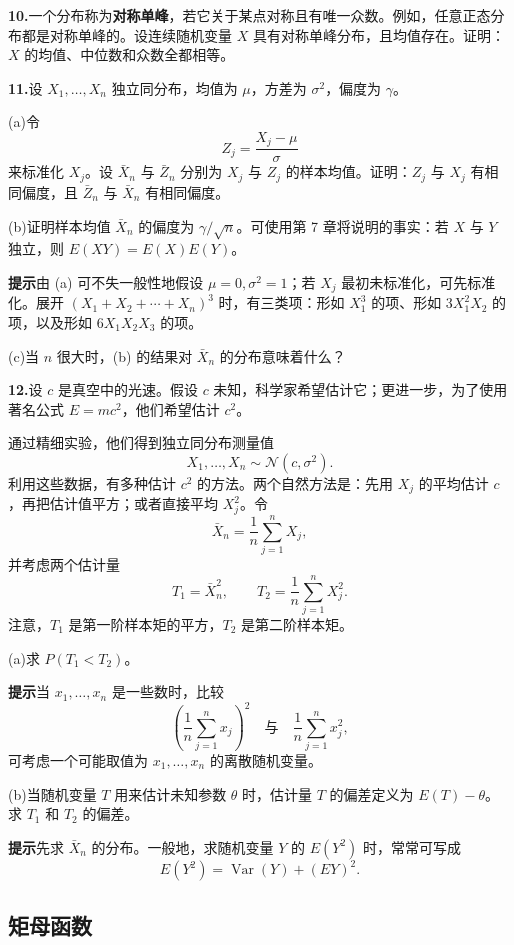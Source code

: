 \documentclass[UTF8, 12pt, fontset=fandol, oneside]{ctexart}
\begin{document}
\noindent\textbf{10.}\quad 一个分布称为\textbf{对称单峰}，若它关于某点对称且有唯一众数。例如，任意正态分布都是对称单峰的。设连续随机变量 $X$ 具有对称单峰分布，且均值存在。证明：$X$ 的均值、中位数和众数全都相等。

\noindent\textbf{11.}\quad 设 $X_1,\ldots,X_n$ 独立同分布，均值为 $\mu$，方差为 $\sigma^2$，偏度为 $\gamma$。

\noindent (a)\quad 令
\[
  Z_j=\frac{X_j-\mu}{\sigma}
\]
来标准化 $X_j$。设 $\bar X_n$ 与 $\bar Z_n$ 分别为 $X_j$ 与 $Z_j$ 的样本均值。证明：$Z_j$ 与 $X_j$ 有相同偏度，且 $\bar Z_n$ 与 $\bar X_n$ 有相同偏度。

\noindent (b)\quad 证明样本均值 $\bar X_n$ 的偏度为 $\gamma/\sqrt n$。可使用第 7 章将说明的事实：若 $X$ 与 $Y$ 独立，则 $E(XY)=E(X)E(Y)$。

\noindent\textbf{提示}\quad 由 (a) 可不失一般性地假设 $\mu=0,\sigma^2=1$；若 $X_j$ 最初未标准化，可先标准化。展开 $(X_1+X_2+\cdots+X_n)^3$ 时，有三类项：形如 $X_1^3$ 的项、形如 $3X_1^2X_2$ 的项，以及形如 $6X_1X_2X_3$ 的项。

\noindent (c)\quad 当 $n$ 很大时，(b) 的结果对 $\bar X_n$ 的分布意味着什么？

\noindent\textbf{12.}\quad 设 $c$ 是真空中的光速。假设 $c$ 未知，科学家希望估计它；更进一步，为了使用著名公式 $E=mc^2$，他们希望估计 $c^2$。

通过精细实验，他们得到独立同分布测量值
\[
  X_1,\ldots,X_n\sim\mathcal{N}(c,\sigma^2).
\]
利用这些数据，有多种估计 $c^2$ 的方法。两个自然方法是：先用 $X_j$ 的平均估计 $c$，再把估计值平方；或者直接平均 $X_j^2$。令
\[
  \bar X_n=\frac1n\sum_{j=1}^n X_j,
\]
并考虑两个估计量
\[
  T_1=\bar X_n^2,\qquad
  T_2=\frac1n\sum_{j=1}^nX_j^2.
\]
注意，$T_1$ 是第一阶样本矩的平方，$T_2$ 是第二阶样本矩。

\noindent (a)\quad 求 $P(T_1<T_2)$。

\noindent\textbf{提示}\quad 当 $x_1,\ldots,x_n$ 是一些数时，比较
\[
  \left(\frac1n\sum_{j=1}^n x_j\right)^2
  \quad\text{与}\quad
  \frac1n\sum_{j=1}^n x_j^2,
\]
可考虑一个可能取值为 $x_1,\ldots,x_n$ 的离散随机变量。

\noindent (b)\quad 当随机变量 $T$ 用来估计未知参数 $\theta$ 时，估计量 $T$ 的偏差定义为 $E(T)-\theta$。求 $T_1$ 和 $T_2$ 的偏差。

\noindent\textbf{提示}\quad 先求 $\bar X_n$ 的分布。一般地，求随机变量 $Y$ 的 $E(Y^2)$ 时，常常可写成
\[
  E(Y^2)=\operatorname{Var}(Y)+(EY)^2.
\]

\subsection*{矩母函数}
\end{document}
